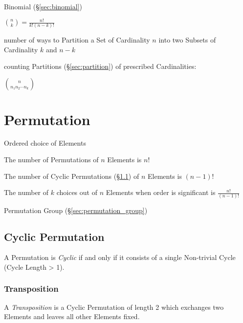Binomial (\S\ref{sec:binomial})

$\binom{n}{k} = \frac{n!}{k!(n - k)!}$

number of ways to Partition a Set of Cardinality $n$ into two Subsets of
Cardinality $k$ and $n-k$

counting Partitions (\S\ref{sec:partition}) of prescribed Cardinalities:

$\binom{n}{n_1 n_2 \cdots n_k}$



\section{Permutation}\label{sec:permutation}

Ordered choice of Elements

The number of Permutations of $n$ Elements is $n!$

The number of Cyclic Permutations (\S\ref{sec:cyclic_permutation}) of
$n$ Elements is $(n-1)!$

The number of $k$ choices out of $n$ Elements when order is
significant is $\frac{n!}{(n-1)!}$

Permutation Group (\S\ref{sec:permutation_group})



\subsection{Cyclic Permutation}\label{sec:cyclic_permutation}

A Permutation is \emph{Cyclic} if and only if it consists of a single
Non-trivial Cycle (Cycle Length > 1).



\subsubsection{Transposition}\label{sec:transposition}

A \emph{Transposition} is a Cyclic Permutation of length 2 which
exchanges two Elements and leaves all other Elements fixed.



